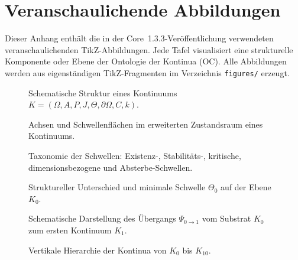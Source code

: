 
\section{Veranschaulichende Abbildungen}
\label{sec:figures}

Dieser Anhang enthält die in der Core~1.3.3-Veröffentlichung verwendeten
veranschaulichenden TikZ-Abbildungen. Jede Tafel visualisiert eine
strukturelle Komponente oder Ebene der Ontologie der Kontinua (OC). Alle
Abbildungen werden aus eigenständigen TikZ-Fragmenten im Verzeichnis
\texttt{figures/} erzeugt.

\begin{figure}[p]
  \centering
  
  \caption{Schematische Struktur eines Kontinuums
           \(K = (\Omega, A, P, J, \Theta, \partial\Omega, C, k)\).}
  \label{fig:continua-structure}
\end{figure}

\begin{figure}[p]
  \centering
  
  \caption{Achsen und Schwellenflächen im erweiterten Zustandsraum eines
           Kontinuums.}
  \label{fig:axes-thresholds}
\end{figure}

\begin{figure}[p]
  \centering
  
  \caption{Taxonomie der Schwellen: Existenz-, Stabilitäts-, kritische,
           dimensionsbezogene und Absterbe-Schwellen.}
  \label{fig:thresholds-taxonomy}
\end{figure}

\begin{figure}[p]
  \centering
  
  \caption{Struktureller Unterschied und minimale Schwelle
           \texorpdfstring{\(\Theta_0\)}{\Theta_0} auf der Ebene
           \texorpdfstring{\(K_0\)}{K_0}.}
  \label{fig:delta-threshold-k0}
\end{figure}

\begin{figure}[p]
  \centering
  
  \caption{Schematische Darstellung des Übergangs
           \(\Psi_{0\to 1}\) vom Substrat
           \(K_0\) zum ersten Kontinuum \(K_1\).}
  \label{fig:k0-k1-transition}
\end{figure}

\begin{figure}[p]
  \centering
  
  \caption{Vertikale Hierarchie der Kontinua von
           \texorpdfstring{\(K_0\)}{K_0} bis \(K_{10}\).}
  \label{fig:levels-hierarchy}
\end{figure}

